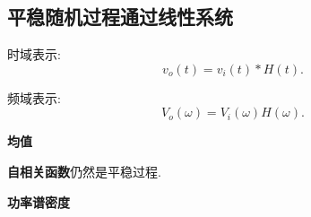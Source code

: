 \subsection{平稳随机过程通过线性系统}
时域表示:
\begin{equation}
    v_o(t)=v_i(t)*H(t).
\end{equation}

频域表示:
\begin{equation}
    V_o(\omega)=V_i(\omega)H(\omega).
\end{equation}

\textbf{均值}

\textbf{自相关函数}\quad 仍然是平稳过程.

\textbf{功率谱密度}

